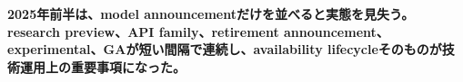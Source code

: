 \noindent\textbf{2025年前半は、model announcementだけを並べると実態を見失う。research preview、API family、retirement announcement、experimental、GAが短い間隔で連続し、availability lifecycleそのものが技術運用上の重要事項になった。}\autocite{src-31799a46d8d0,src-3fa7f4cd510b,src-53f15d483a2d}
